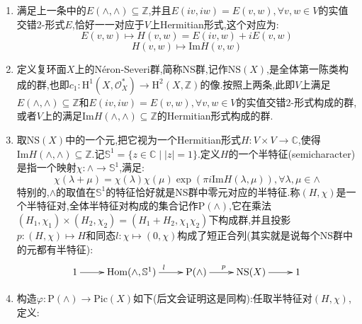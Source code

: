 \begin{enumerate}
\begin{proof}
		考虑如下图表,其中$l$是典范嵌入,$\beta_2,\gamma_2$是hodge分解中的典范同构,$p$是相应的投影映射,这个图表交换是因为$\mathrm{H}^2(X,\mathbb{Z})\to\mathrm{H}^2(X,\mathscr{O}_X)$的确经$\mathrm{H}^2(X,\mathbb{C})$的hodge分解投影到$\mathrm{H}^{0,2}(X)$.
		$$\xymatrix{\mathrm{H}^1(X,\mathscr{O}_X^*)\ar[rr]^{c_1}&&\mathrm{H}^2(X,\mathbb{Z})\ar[rr]\ar[d]^l&&\mathrm{H}^2(X,\mathscr{O}_X)\ar@{=}[d]\\&&\mathrm{H}^2(X,\mathbb{C})\ar[rr]^p\ar[d]^{\beta_2^{-1}}\ar[rr]^p&&\mathrm{H}^{0,2}(X)\ar[d]^{\gamma_2^{-1}}\\&&\wedge^2\Omega\oplus\left(\Omega\otimes\overline{\Omega}\right)\oplus\wedge^2\overline{\Omega}\ar[rr]^p&&\wedge^2\overline{\Omega}}$$
		现在设$L\in\mathrm{H}^1(X,\mathscr{O}_X^*)$,记hodge分解$\beta_2^{-1}\circ l\circ c_1(L)=E=E_1+E_2+E_3$.上述图表的交换性告诉我们$E_3=0$,又按照$E$的取值是实数,有$E_1=\overline{E_3}$,进而$E_1=0$,进而$E=E_2$,这得到必要性.充分性是类似的.
	\end{proof}
    \item 满足上一条中的$E(\wedge,\wedge)\subseteq\mathbb{Z}$,并且$E(iv,iw)=E(v,w),\forall v,w\in V$的实值交错2-形式$E$,恰好一一对应于$V$上Hermitian形式,这个对应为:
    $$E(v,w)\mapsto H(v,w)=E(iv,w)+iE(v,w)$$
    $$H(v,w)\mapsto\mathrm{Im}H(v,w)$$
    \item 定义复环面$X$上的N\'eron-Severi群,简称NS群,记作$\mathrm{NS}(X)$,是全体第一陈类构成的群,也即$c_1:\mathrm{H}^1(X,\mathscr{O}_X^*)\to\mathrm{H}^2(X,\mathbb{Z})$的像.按照上两条,此即$V$上满足$E(\wedge,\wedge)\subseteq\mathbb{Z}$和$E(iv,iw)=E(v,w),\forall v,w\in V$的实值交错2-形式构成的群,或者$V$上的满足$\mathrm{Im}H(\wedge,\wedge)\subseteq\mathbb{Z}$的Hermitian形式构成的群.
    \item 取$\mathrm{NS}(X)$中的一个元,把它视为一个Hermitian形式$H:V\times V\to\mathbb{C}$,使得$\mathrm{Im}H(\wedge,\wedge)\subseteq\mathbb{Z}$.记$\mathbb{S}^1=\{z\in\mathbb{C}\mid|z|=1\}$.定义$H$的一个半特征(semicharacter)是指一个映射$\chi:\wedge\to\mathbb{S}^1$,满足:
    $$\chi(\lambda+\mu)=\chi(\lambda)\chi(\mu)\exp(\pi i\mathrm{Im}H(\lambda,\mu)),\forall\lambda,\mu\in\wedge$$
    特别的,$\wedge$的取值在$\mathbb{S}^1$的特征恰好就是NS群中零元对应的半特征.称$(H,\chi)$是一个半特征对,全体半特征对构成的集合记作$\mathrm{P}(\wedge)$,它在乘法$(H_1,\chi_1)\times(H_2,\chi_2)=(H_1+H_2,\chi_1\chi_2)$下构成群,并且投影$p:(H,\chi)\mapsto H$和同态$l:\chi\mapsto(0,\chi)$构成了短正合列(其实就是说每个NS群中的元都有半特征):
    $$\xymatrix{1\ar[r]&\mathrm{Hom}(\wedge,\mathbb{S}^1)\ar[r]^l&\mathrm{P}(\wedge)\ar[r]^p&\mathrm{NS}(X)\ar[r]&1}$$
    \item 构造$\varphi:\mathrm{P}(\wedge)\to\mathrm{Pic}(X)$如下(后文会证明这是同构):任取半特征对$(H,\chi)$,定义:

\end{enumerate}
